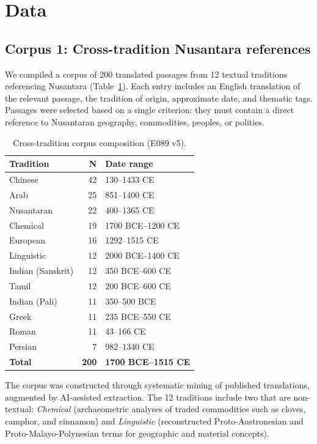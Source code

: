 \documentclass[12pt]{article}
\begin{document}
\section{Data}

\subsection{Corpus 1: Cross-tradition Nusantara references}

We compiled a corpus of 200 translated passages from 12 textual traditions referencing Nusantara (Table~\ref{tab:corpus1}).
Each entry includes an English translation of the relevant passage, the tradition of origin, approximate date, and thematic tags.
Passages were selected based on a single criterion: they must contain a direct reference to Nusantaran geography, commodities, peoples, or polities.

\begin{table}[htbp]
\centering
\caption{Cross-tradition corpus composition (E089 v5).}
\label{tab:corpus1}
\begin{tabular}{lrl}
\toprule
\textbf{Tradition} & \textbf{N} & \textbf{Date range} \\
\midrule
Chinese     & 42 & 130--1433 CE \\
Arab        & 25 & 851--1400 CE \\
Nusantaran  & 22 & 400--1365 CE \\
Chemical    & 19 & 1700 BCE--1200 CE \\
European    & 16 & 1292--1515 CE \\
Linguistic  & 12 & 2000 BCE--1400 CE \\
Indian (Sanskrit) & 12 & 350 BCE--600 CE \\
Tamil       & 12 & 200 BCE--600 CE \\
Indian (Pali)     & 11 & 350--500 BCE \\
Greek       & 11 & 235 BCE--550 CE \\
Roman       & 11 & 43--166 CE \\
Persian     &  7 & 982--1340 CE \\
\midrule
\textbf{Total} & \textbf{200} & \textbf{1700 BCE--1515 CE} \\
\bottomrule
\end{tabular}
\end{table}

The corpus was constructed through systematic mining of published translations, augmented by AI-assisted extraction.
The 12 traditions include two that are non-textual: \textit{Chemical} (archaeometric analyses of traded commodities such as cloves, camphor, and cinnamon) and \textit{Linguistic} (reconstructed Proto-Austronesian and Proto-Malayo-Polynesian terms for geographic and material concepts).
\end{document}

